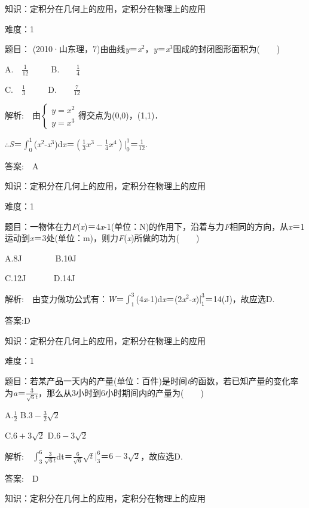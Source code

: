 \documentclass{article} %
\begin{document}
 知识：定积分在几何上的应用，定积分在物理上的应用

 难度：1

 题目： (2010·山东理，7)由曲线\textit{y}＝\textit{x}${}^{2}$，\textit{y}＝\textit{x}${}^{3}$围成的封闭图形面积为(　　)

A.　$\frac{1}{12}$ 　　     B.　　$\frac{1}{4}$ 　

C.　$\frac{1}{3}$ 　　       D.　　$\frac{7}{12}$

 解析:　由$\left\{\begin{array}{r}y=x^2\\y=x^3\end{array} \right.$得交点为(0,0)，(1,1)．

$\mathrm{\therefore}$\textit{S}＝$\int_{0}^{1}$(\textit{x}${}^{2}$-\textit{x}${}^{3}$)d\textit{x}＝$(\frac{1}{3}x^3-\frac{1}{4}x^4)|_0^1$＝$\frac{1}{12}$.

 答案:　A



 知识：定积分在几何上的应用，定积分在物理上的应用

 难度：1

 题目：一物体在力\textit{F}(\textit{x})＝4\textit{x}-1(单位：N)的作用下，沿着与力\textit{F}相同的方向，从\textit{x}＝1运动到\textit{x}＝3处(单位：m)，则力\textit{F}(\textit{x})所做的功为(　　)

A.8J　 　 　    B.10J　　　

C.12J　　　    D.14J

 解析:　由变力做功公式有：\textit{W}＝$\int_{1}^{3}$(4\textit{x}-1)d\textit{x}＝(2\textit{x}${}^{2}$-\textit{x})$|_1^3$＝14(J)，故应选D.

 答案:D



 知识：定积分在几何上的应用，定积分在物理上的应用

 难度：1

 题目：若某产品一天内的产量(单位：百件)是时间\textit{t}的函数，若已知产量的变化率为\textit{a}＝$\frac{3}{\sqrt{6}t}$，那么从3小时到6小时期间内的产量为(　　)

A.$\frac{1}{2}$       B.$3-\frac{3}{2}\sqrt{2}$

C.$6+3\sqrt{2}$     D.$6-3\sqrt{2}$

 解析:　$\int_{3}^{6}\frac{3}{\sqrt{6}t}$dt＝$\frac{6}{\sqrt{6}}\sqrt{t}|_3^6$＝$6-3\sqrt{2}$，故应选D.

 答案:　D



 知识：定积分在几何上的应用，定积分在物理上的应用
\end{document}
